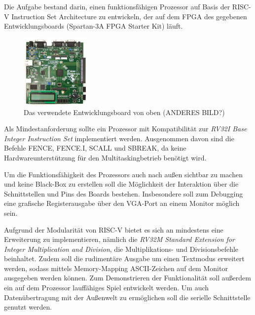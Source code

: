 

Die Aufgabe bestand darin, einen funktionsf\"ahigen Prozessor auf Basis der RISC-V Instruction Set Architecture zu entwickeln, der auf dem FPGA des gegebenen Entwicklungsboards (Spartan-3A FPGA Starter Kit) l\"auft. 
\begin{figure}[H]
	\centering
		\includegraphics[width=0.3\textwidth]{Board.png}
	\caption{Das verwendete Entwicklungsboard von oben  (ANDERES BILD?)}
	\label{fig:board}
\end{figure}

Als Mindestanforderung sollte ein Prozessor mit Kompatibilit\"at zur \textit{RV32I Base Integer Instruction Set} implementiert werden. Ausgenommen davon sind die Befehle FENCE, FENCE.I, SCALL und SBREAK, da keine Hardwareunterst\"utzung f\"ur den Multitaskingbetrieb ben\"otigt wird.

Um die Funktionsf\"ahigkeit des Prozessors auch nach au{\ss}en sichtbar zu machen und keine Black-Box zu erstellen soll die M\"oglichkeit der Interaktion \"uber die Schnittstellen und Pins des Boards bestehen. Insbesondere soll zum Debugging eine grafische Registerausgabe \"uber den VGA-Port an einem Monitor m\"oglich sein.


Aufgrund der Modularit\"at von RISC-V bietet es sich an mindestens eine Erweiterung zu implementieren, n\"amlich die \textit{RV32M Standard Extension for Integer Multiplication and Division}, die Multiplikations- und Divisionsbefehle beinhaltet. Zudem soll die rudiment\"are Ausgabe um einen Textmodus erweitert werden, sodass mittels Memory-Mapping ASCII-Zeichen auf dem Monitor ausgegeben werden k\"onnen. Zum Demonstrieren der Funktionalit\"at soll au{\ss}erdem ein auf dem Prozessor lauff\"ahiges Spiel entwickelt werden. Um auch Daten\"ubertragung mit der Au{\ss}enwelt zu erm\"oglichen soll die serielle Schnittstelle genutzt werden.

